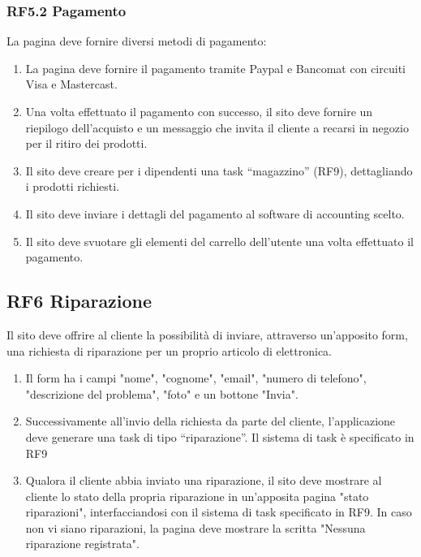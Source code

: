 \documentclass{report}
\begin{document}
\subsubsection*{RF5.2 Pagamento}
La pagina deve fornire diversi metodi di pagamento:

\begin{enumerate}
	\item La pagina deve fornire il pagamento tramite Paypal e Bancomat con circuiti Visa e Mastercast.
	\item Una volta effettuato il pagamento con successo, il sito deve fornire un riepilogo dell’acquisto e un messaggio che invita il cliente a recarsi in negozio per il ritiro dei prodotti.
	\item Il sito deve creare per i dipendenti una task “magazzino” (RF9), dettagliando i prodotti richiesti.
	\item Il sito deve inviare i dettagli del pagamento al software di accounting scelto.
	\item Il sito deve svuotare gli elementi del carrello dell’utente una volta effettuato il pagamento.
\end{enumerate}

\subsection*{RF6 Riparazione}

Il sito deve offrire al cliente la possibilità di inviare, attraverso un'apposito form, una richiesta di riparazione per un proprio articolo di elettronica.
\begin{enumerate}

	
	\item Il form ha i campi "nome", "cognome", "email", "numero di telefono", "descrizione del problema", "foto" e un bottone "Invia".
	
	\item Successivamente all’invio della richiesta da parte del cliente, l’applicazione deve generare una task di tipo “riparazione”. Il sistema di task è specificato in RF9
	
	\item Qualora il cliente abbia inviato una riparazione, il sito deve mostrare al cliente lo stato della propria riparazione in un'apposita pagina "stato riparazioni", interfacciandosi con il sistema di task specificato in RF9. In caso non vi siano riparazioni, la pagina deve mostrare la scritta "Nessuna riparazione registrata".
	
\end{enumerate}
\end{document}
